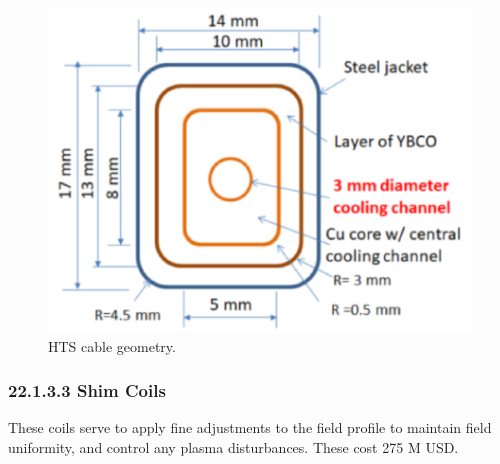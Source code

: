 \begin{figure}[h]
    \centering
    \includegraphics[width =0.5\linewidth]{StandardFigures/yuhu_cs.pdf}
    \caption{HTS cable geometry.}
    \label{fig:yuhu_cs}
\end{figure}

\subsubsection*{22.1.3.3 Shim Coils}

These coils serve to apply fine adjustments to the field profile to maintain field uniformity, and control any plasma disturbances. These cost 275 M USD.\\

